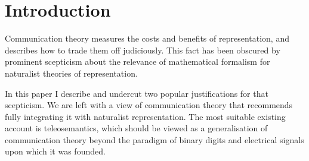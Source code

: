 \section{Introduction}\label{sec:intro}

Communication theory measures the costs and benefits of representation, and describes how to trade them off judiciously. 
This fact has been obscured by prominent scepticism about the relevance of mathematical formalism for naturalist theories of representation. 

In this paper I describe and undercut two popular justifications for that scepticism.
We are left with a view of communication theory that recommends fully integrating it with naturalist representation. 
The most suitable existing account is teleosemantics, which should be viewed as a generalisation of communication theory beyond the paradigm of binary digits and electrical signals upon which it was founded.  